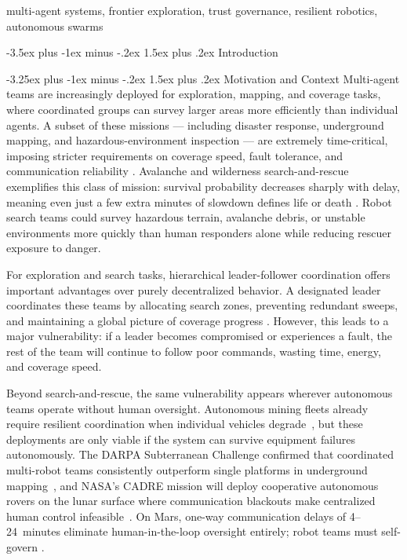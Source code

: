 \documentclass[conference]{IEEEtran}
\makeatletter
\renewcommand{\section}{\@startsection{section}{1}{\z@}%
  {-3.5ex plus -1ex minus -.2ex}%
  {1.5ex plus .2ex}%
  {\normalfont\large\bfseries\centering}}
\renewcommand{\subsection}{\@startsection{subsection}{2}{\z@}%
  {-3.25ex plus -1ex minus -.2ex}%
  {1.5ex plus .2ex}%
  {\normalfont\normalsize\itshape\centering}}
\makeatother
\begin{document}
\begin{IEEEkeywords}
multi-agent systems, frontier exploration, trust governance, resilient robotics, autonomous swarms
\end{IEEEkeywords}

\section{Introduction}
\label{sec:introduction}

\subsection{Motivation and Context}
Multi-agent teams are increasingly deployed for exploration, mapping, and coverage tasks, where coordinated groups can survey larger areas more efficiently than individual agents. A subset of these missions — including disaster response, underground mapping, and hazardous-environment inspection — are extremely time-critical, imposing stricter requirements on coverage speed, fault tolerance, and communication reliability \cite{queralta2020sar, murphy2004rescue}. Avalanche and wilderness search-and-rescue exemplifies this class of mission: survival probability decreases sharply with delay, meaning even just a few extra minutes of slowdown defines life or death \cite{rauch2024avalanche}. Robot search teams could survey hazardous terrain, avalanche debris, or unstable environments more quickly than human responders alone while reducing rescuer exposure to danger.

 
For exploration and search tasks, hierarchical leader-follower coordination offers important advantages over purely decentralized behavior. A designated leader coordinates these teams by allocating search zones, preventing redundant sweeps, and maintaining a global picture of coverage progress \cite{yamauchi1997frontier, burgard2000collaborative, simmons2000coordination}. However, this leads to a major vulnerability: if a leader becomes compromised or experiences a fault, the rest of the team will continue to follow poor commands, wasting time, energy, and coverage speed.

Beyond search-and-rescue, the same vulnerability appears wherever autonomous teams operate without human oversight. Autonomous mining fleets already require resilient coordination when individual vehicles degrade~\cite{marshall2016robotics}, but these deployments are only viable if the system can survive equipment failures autonomously. The DARPA Subterranean Challenge confirmed that coordinated multi-robot teams consistently outperform single platforms in underground mapping~\cite{chung2023darpa}, and NASA's CADRE mission will deploy cooperative autonomous rovers on the lunar surface where communication blackouts make centralized human control infeasible~\cite{delacroix2024cadre, whittaker2012lunar}. On Mars, one-way communication delays of 4--24~minutes eliminate human-in-the-loop oversight entirely; robot teams must self-govern \cite{mcbrayer2022comm}.
 
\end{document}
